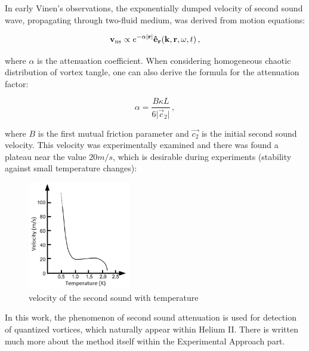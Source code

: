 In early Vinen's observations, the exponentially dumped velocity of second sound wave, propagating through two-fluid medium, was derived from motion equations:

\begin{equation}
\mathbf{v}_{\mathrm{ns}} \propto e^{-\alpha \vert \mathbf{r} \vert} \mathbf{\hat{e}}_{\mathbf{r}}(\mathbf{k},\mathbf{r},\omega,t)\,,
\end{equation}

where $\alpha$ is the attenuation coefficient. When considering homogeneous chaotic distribution of vortex tangle, one can also derive the formula for the attenuation factor:

\begin{equation}
\alpha = \frac{B\kappa L}{6 \vert \vec{c}_2\vert}
\label{alpha_mean}\,,
\end{equation}

where $B$ is the first mutual friction parameter and $\vec{c_2}$ is the initial second sound velocity. This velocity was experimentally examined and there was found a plateau near the value $20 \unit{m/s}$, which is desirable during experiments (stability against small temperature changes):

\begin{figure}[h]
	\centering
	\includegraphics[width=0.4\textwidth]{graphics/theory/ss_velocity}
	\caption{velocity of the second sound with temperature}
	\label{ss_velocity}
\end{figure}

In this work, the phenomenon of second sound attenuation is used for detection of quantized vortices, which naturally appear within Helium II. There is written much more about the method itself within the Experimental Approach part.

\newpage
